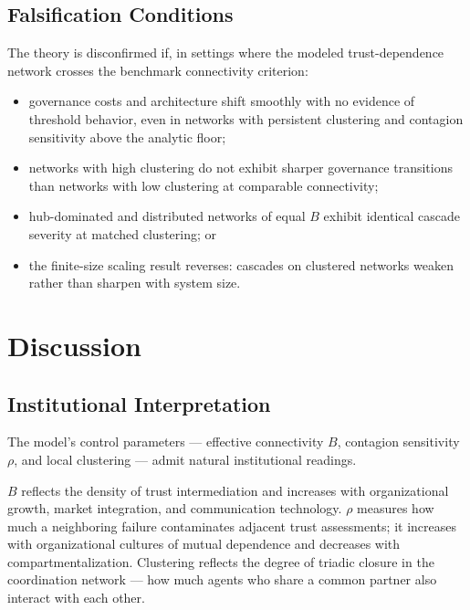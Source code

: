 \documentclass[11pt,a4paper]{article}
\begin{document}
\subsection{Falsification Conditions}

The theory is disconfirmed if, in settings where the modeled trust-dependence network crosses the benchmark connectivity criterion:

\begin{itemize}
\item governance costs and architecture shift smoothly with no evidence of threshold behavior, even in networks with persistent clustering and contagion sensitivity above the analytic floor;
\item networks with high clustering do not exhibit sharper governance transitions than networks with low clustering at comparable connectivity;
\item hub-dominated and distributed networks of equal $B$ exhibit identical cascade severity at matched clustering; or
\item the finite-size scaling result reverses: cascades on clustered networks weaken rather than sharpen with system size.
\end{itemize}



\section{Discussion}

\subsection{Institutional Interpretation}

The model's control parameters --- effective connectivity $B$, contagion sensitivity $\rho$, and local clustering --- admit natural institutional readings.

$B$ reflects the density of trust intermediation and increases with organizational growth, market integration, and communication technology. $\rho$ measures how much a neighboring failure contaminates adjacent trust assessments; it increases with organizational cultures of mutual dependence and decreases with compartmentalization. Clustering reflects the degree of triadic closure in the coordination network --- how much agents who share a common partner also interact with each other.
\end{document}
